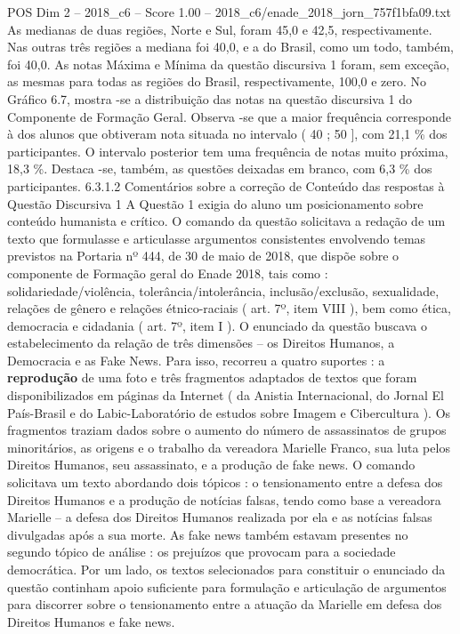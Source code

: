 \begin{textsample}{POS Dim 2 – 2018\_c6 – Score 1.00 – 2018\_c6/enade\_2018\_jorn\_757f1bfa09.txt}
As medianas de duas regiões, Norte e Sul, foram 45,0 e 42,5, respectivamente.
Nas outras três regiões a mediana foi 40,0, e a do Brasil, como um todo, também, foi 40,0.
As notas Máxima e Mínima da questão discursiva 1 foram, sem exceção, as mesmas para todas as regiões do Brasil, respectivamente, 100,0 e zero.
No Gráfico 6.7, mostra -se a distribuição das notas na questão discursiva 1 do Componente de Formação Geral.
Observa -se que a maior frequência corresponde à dos alunos que obtiveram nota situada no intervalo ( 40 ; 50 ], com 21,1 \% dos participantes.
O intervalo posterior tem uma frequência de notas muito próxima, 18,3 \%.
Destaca -se, também, as questões deixadas em branco, com 6,3 \% dos participantes. 6.3.1.2 Comentários sobre a correção de Conteúdo das respostas à Questão Discursiva 1 A Questão 1 exigia do aluno um posicionamento sobre conteúdo humanista e crítico.
O comando da questão solicitava a redação de um texto que formulasse e articulasse argumentos consistentes envolvendo temas previstos na Portaria nº 444, de 30 de maio de 2018, que dispõe sobre o componente de Formação geral do Enade 2018, tais como : solidariedade/violência, tolerância/intolerância, inclusão/exclusão, sexualidade, relações de gênero e relações étnico-raciais ( art. 7º, item VIII ), bem como ética, democracia e cidadania ( art. 7º, item I ).
O enunciado da questão buscava o estabelecimento da relação de três dimensões – os Direitos Humanos, a Democracia e as Fake News.
Para isso, recorreu a quatro suportes : a \textbf{reprodução} de uma foto e três fragmentos adaptados de textos que foram disponibilizados em páginas da Internet ( da Anistia Internacional, do Jornal El País-Brasil e do Labic-Laboratório de estudos sobre Imagem e Cibercultura ).
Os fragmentos traziam dados sobre o aumento do número de assassinatos de grupos minoritários, as origens e o trabalho da vereadora Marielle Franco, sua luta pelos Direitos Humanos, seu assassinato, e a produção de fake news.
O comando solicitava um texto abordando dois tópicos : o tensionamento entre a defesa dos Direitos Humanos e a produção de notícias falsas, tendo como base a vereadora Marielle – a defesa dos Direitos Humanos realizada por ela e as notícias falsas divulgadas após a sua morte.
As fake news também estavam presentes no segundo tópico de análise : os prejuízos que provocam para a sociedade democrática.
Por um lado, os textos selecionados para constituir o enunciado da questão continham apoio suficiente para formulação e articulação de argumentos para discorrer sobre o tensionamento entre a atuação da Marielle em defesa dos Direitos Humanos e fake news.

\end{textsample}
